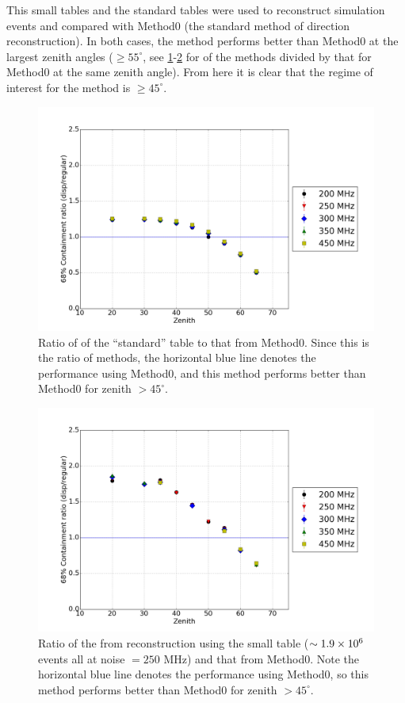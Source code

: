 \documentclass[main.tex]{subfiles}
\begin{document}
This small \disp tables and the standard \disp tables were used to reconstruct simulation events and compared with Method0 (the standard method of direction reconstruction). In both cases, the \disp method performs better than Method0 at the largest zenith angles ($\geq 55^\circ$, see \ref{fig:olddisp_ratio}-\ref{fig:disp_ratio_250} for \rse of the \disp methods divided by that for Method0 at the same zenith angle). From here it is clear that the regime of interest for the \disp method is $\geq45^\circ$. 

\begin{figure}[htbp]
  \begin{center}
      \includegraphics[width=0.75\linewidth]{images/disp_standard_ratio_xzen}
      \caption[``standard'' \disp table reconstruction.]{Ratio of \rse of the ``standard'' \disp table to that from Method0. Since this is the ratio of methods, the horizontal blue line denotes the performance using Method0, and this method performs better than Method0 for zenith $>45^\circ$.}  
      \label{fig:olddisp_ratio}
  \end{center}
\end{figure}

\begin{figure}[htbp]
  \centering
  \includegraphics[width=0.75\linewidth]{images/disp_250_ratio_xzen}
  \caption[Small \disp table reconstruction (noise = $250$ MHz).]{Ratio of the \rse from reconstruction using the small \disp table ($\sim 1.9\times 10^{6}$ events all at noise $= 250$ MHz) and that from Method0. Note the horizontal blue line denotes the performance using Method0, so this method performs better than Method0 for zenith $>45^\circ$.}
  \label{fig:disp_ratio_250}
\end{figure}
\end{document}
